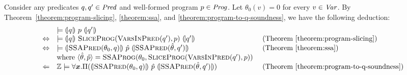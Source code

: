 
Consider any predicates $q, q' \in \mathit{Pred}$ and well-formed program $p \in
\mathit{Prog}$. Let $\theta_0 (v) = 0$ for every $v \in \mathit{Var}$. By
Theorem~\ref{theorem:program-slicing}, \ref{theorem:ssa}, and
\ref{theorem:program-to-q-soundness}, we have the following deduction:
\begin{equation*}
  \begin{array}{cll}
    & \models \hoaretriple{q}{p}{q'}\\
    \Leftrightarrow
    & \models 
      \hoaretriple{q}{\textsc{SliceProg}(\textsc{VarsInPred}(q'), p)}{q'}
    & \textmd{ (Theorem~\ref{theorem:program-slicing})}\\
    \Leftrightarrow
    & \models
      \hoaretriple{\textsc{SSAPred}(\theta_0, q)}
      {\hat{p}}
      {\textsc{SSAPred}(\hat{\theta}, q')}
    & \textmd{ (Theorem~\ref{theorem:ssa})}\\
    &
      \textmd{where } \langle \hat{\theta}, \hat{p} \rangle = 
      \textsc{SSAProg} (\theta_0, \textsc{SliceProg}
      (\textsc{VarsInPred}(q'), p))\\
    \Leftarrow
    & \bbfZ \models \forall \vx.
      \Pi (\hoaretriple{\textsc{SSAPred}(\theta_0, q)} {\hat{p}}
      {\textsc{SSAPred}(\hat{\theta}, q')})
    & \textmd{ (Theorem~\ref{theorem:program-to-q-soundness})}
  \end{array}
\end{equation*}
